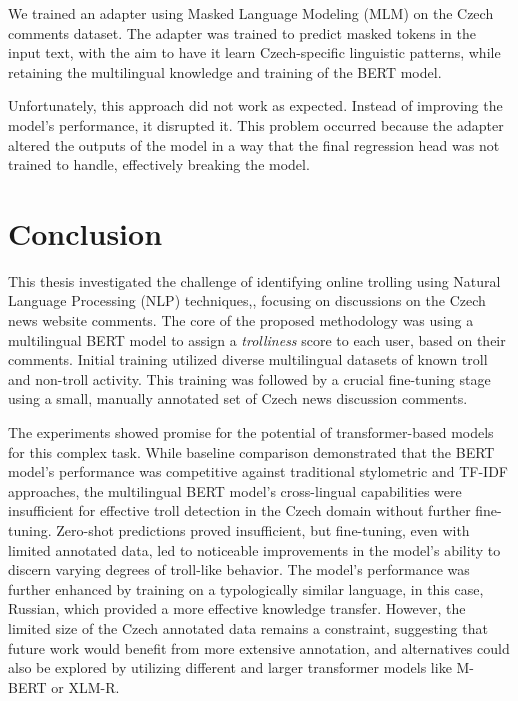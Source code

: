 \documentclass[twoside]{ctuthesis}
\theoremstyle{plain}
\theoremstyle{definition}
\theoremstyle{note}
\begin{document}
We trained an adapter using Masked Language Modeling (MLM) on the Czech comments dataset. The adapter was trained to predict masked tokens in the input text, with the aim to have it learn Czech-specific linguistic patterns, while retaining the multilingual knowledge and training of the BERT model.\par

Unfortunately, this approach did not work as expected. Instead of improving the model's performance, it disrupted it. This problem occurred because the adapter altered the outputs of the model in a way that the final regression head was not trained to handle, effectively breaking the model. \par
 
\chapter{Conclusion}

This thesis investigated the challenge of identifying online trolling using Natural Language Processing (NLP) techniques,, focusing on discussions on the Czech news website comments. The core of the proposed methodology was using a multilingual BERT model to assign a \textit{trolliness} score to each user, based on their comments. Initial training utilized diverse multilingual datasets of known troll and non-troll activity. This training was followed by a crucial fine-tuning stage using a small, manually annotated set of Czech news discussion comments.

The experiments showed promise for the potential of transformer-based models for this complex task. While baseline comparison demonstrated that the BERT model's performance was competitive against traditional stylometric and TF-IDF approaches, the multilingual BERT model's cross-lingual capabilities were insufficient for effective troll detection in the Czech domain without further fine-tuning. Zero-shot predictions proved insufficient, but fine-tuning, even with limited annotated data, led to noticeable improvements in the model's ability to discern varying degrees of troll-like behavior. The model's performance was further enhanced by training on a typologically similar language, in this case, Russian, which provided a more effective knowledge transfer. However, the limited size of the Czech annotated data remains a constraint, suggesting that future work would benefit from more extensive annotation, and alternatives could also be explored by utilizing different and larger transformer models like M-BERT or XLM-R.\par
\end{document}
